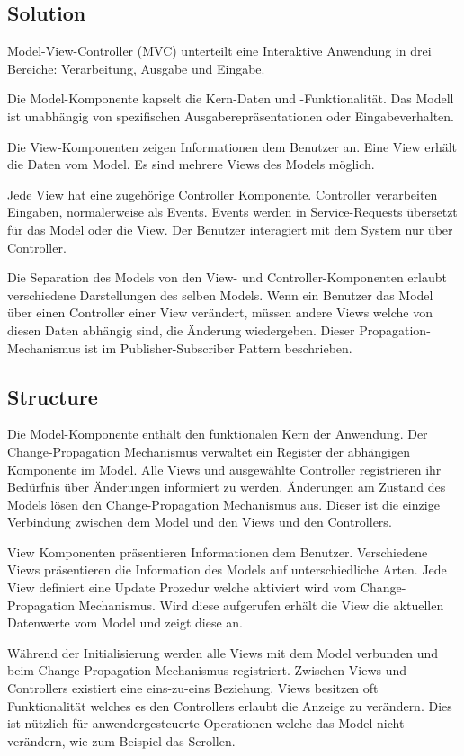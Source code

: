 \subsection*{Solution}


Model-View-Controller (MVC) unterteilt eine Interaktive Anwendung in drei Bereiche: Verarbeitung, Ausgabe und Eingabe.

Die Model-Komponente kapselt die Kern-Daten und -Funktionalität. Das Modell ist unabhängig von spezifischen Ausgaberepräsentationen oder Eingabeverhalten.

Die View-Komponenten zeigen Informationen dem Benutzer an. Eine View erhält die Daten vom Model. Es sind mehrere Views des Models möglich.

Jede View hat eine zugehörige Controller Komponente. Controller verarbeiten Eingaben, normalerweise als Events. Events werden in Service-Requests übersetzt für das Model oder die View. Der Benutzer interagiert mit dem System nur über Controller.

Die Separation des Models von den View- und Controller-Komponenten erlaubt  verschiedene Darstellungen des selben Models. Wenn ein Benutzer das Model über einen Controller einer View verändert, müssen andere Views welche von diesen Daten abhängig sind, die Änderung wiedergeben. Dieser Propagation-Mechanismus ist im Publisher-Subscriber Pattern beschrieben.

\subsection*{Structure}


Die Model-Komponente enthält den funktionalen Kern der Anwendung. Der Change-Propagation Mechanismus verwaltet ein Register der abhängigen Komponente im Model. Alle Views und ausgewählte Controller registrieren ihr Bedürfnis über Änderungen informiert zu werden. Änderungen am Zustand des Models lösen den Change-Propagation Mechanismus aus. Dieser ist die einzige Verbindung zwischen dem Model und den Views und den Controllers.

View Komponenten präsentieren Informationen dem Benutzer. Verschiedene Views präsentieren die Information des Models auf unterschiedliche Arten. Jede View definiert eine Update Prozedur welche aktiviert wird vom Change-Propagation Mechanismus. Wird diese aufgerufen erhält die View die aktuellen Datenwerte vom Model und zeigt diese an.

Während der Initialisierung werden alle Views mit dem Model verbunden und beim Change-Propagation Mechanismus registriert. Zwischen Views und Controllers existiert eine eins-zu-eins Beziehung. Views besitzen oft Funktionalität welches es den Controllers erlaubt die Anzeige zu verändern. Dies ist nützlich für anwendergesteuerte Operationen welche das Model nicht verändern, wie zum Beispiel das Scrollen.

